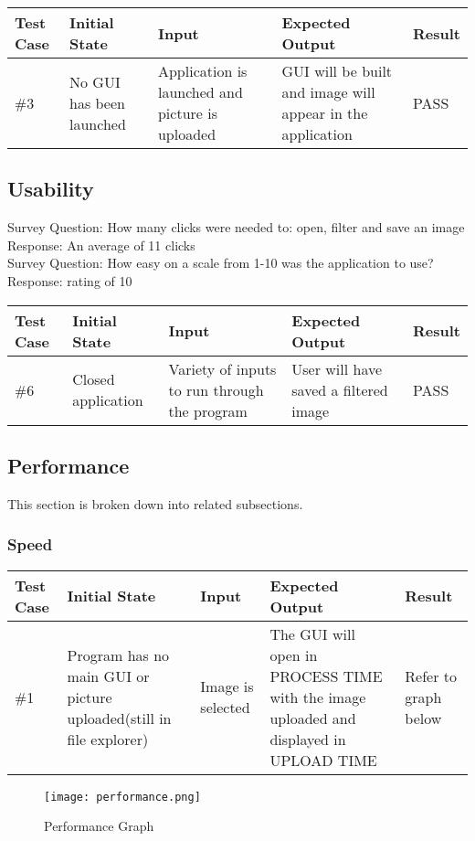 \documentclass[12pt, titlepage]{article}
\begin{document}
\begin{table}[h]
\scriptsize
\begin{tabu} to 1.1\textwidth { | X[.3] | X[.7] | X[.7] | X[.7] | X[.3] |}
\hline
	      		Test Case & Initial State & Input & Expected Output & Result \\
\hline
\#3
& No GUI has been launched
& Application is launched and picture is uploaded
& GUI will be built and image will appear in the application
& PASS\\
\hline
	\end{tabu}
	\end{table}

\subsection{Usability}
\noindent Survey Question: How many clicks were needed to: open, filter and save an image\\
Response: An average of 11 clicks\\
Survey Question: How easy on a scale from 1-10 was the application to use?\\
Response: rating of 10\\

\begin{table}[h]
\scriptsize
\begin{tabu} to 1.1\textwidth { | X[.3] | X[.7] | X[.7] | X[.7] | X[.3] |}
\hline
	      		Test Case & Initial State & Input & Expected Output & Result \\
\hline
\#6
& Closed application
& Variety of inputs to run through the program
& User will have saved a filtered image
& PASS\\
\hline
	\end{tabu}
	\end{table}

\subsection{Performance}
This section is broken down into related subsections.
\subsubsection{Speed}
\begin{table}[h]
\scriptsize
\begin{tabu} to 1.1\textwidth { | X[.3] | X[.7] | X[.7] | X[.7] | X[.3] |}
\hline
	      		Test Case & Initial State & Input & Expected Output & Result \\
\hline
\#1
& Program has no main GUI or picture uploaded(still in file explorer)
& Image is selected
& The GUI will open in PROCESS TIME with the image uploaded and displayed in UPLOAD TIME
& Refer to graph below\\
\hline
	\end{tabu}
	\end{table}
\begin{figure}[h]
\texttt{[image: performance.png]}
\caption{Performance Graph}
\end{figure}
\end{document}
